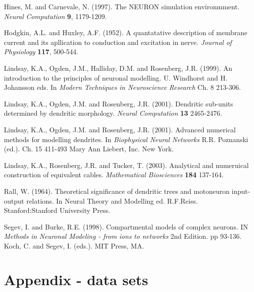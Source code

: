  


\begin{thebibliography}{99}

 Hines, M. and Carnevale, N. (1997). The
NEURON simulation environmment. \emph{Neural Computation} {\bf 9},
1179-1209.

 Hodgkin, A.L. and Huxley, A.F. (1952). A
quantatative description of membrane current and its apllication
to conduction and excitation in nerve. \emph{Journal of
Physiology} {\bf 117}, 500-544.

 Lindsay, K.A., Ogden, J.M.,
Halliday, D.M. and Rosenberg, J.R. (1999). An introduction to the
principles of neuronal modelling. U. Windhorst and H. Johansson
eds. In \emph{Modern Techniques in Neuroscience Research}
Ch. 8 213-306.

 Lindsay, K.A., Ogden, J.M. and
Rosenberg, J.R. (2001). Dendritic sub-units determined by
dendritic morphology. \emph{Neural Computation} \textbf{13}
2465-2476.

 Lindsay, K.A., Ogden, J.M. and
Rosenberg, J.R. (2001). Advanced numerical methods for modelling
dendrites. In \emph{Biophysical Neural Networks} R.R. Poznanski
(ed.). Ch. 15 411-493 Mary Ann Liebert, Inc. New York.

 Lindsay, K.A., Rosenberg, J.R. and
Tucker, T. (2003). Analytical and numeruical construction of
equivalent cables. \emph{Mathematical Biosciences} \textbf{184}
137-164.

 Rall, W. (1964). Theoretical significance
of dendritic trees and motoneuron input-output relations. In
{Neural Theory and Modelling} ed. R.F.Reiss. Stanford:Stanford
University Press.

 Segev, I. and Burke, R.E. (1998).
Compartmental models of complex neurons. IN \emph{Methods in
Neuronal Modeling - from ions to networks} 2nd Edition. pp 93-136.
Koch, C. and Segev, I. (eds.). MIT Press, MA.




\end{thebibliography}

\pagebreak[4]

\section*{Appendix - data sets}

